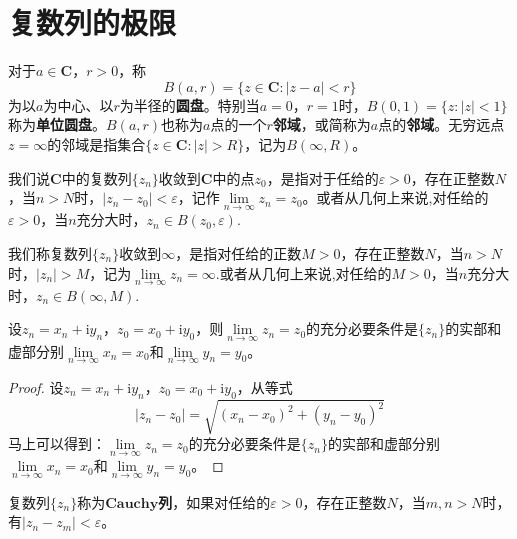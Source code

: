 \documentclass[../../main.tex]{subfiles}
\begin{document}
\section{复数列的极限}

\begin{definition}
对于\(a \in \mathbf{C}\)，\(r > 0\)，称
\[
B(a, r) = \{ z \in \mathbf{C} : | z - a | < r \}
\]
为以\(a\)为中心、以\(r\)为半径的\textbf{圆盘}。特别当\(a = 0\)，\(r = 1\)时，\(B(0, 1) = \{ z : | z | < 1 \}\)称为\textbf{单位圆盘}。\(B(a, r)\)也称为\(a\)点的一个\textbf{\(r\)邻域}，或简称为\(a\)点的\textbf{邻域}。无穷远点\(z = \infty\)的邻域是指集合\(\{ z \in \mathbf{C} : | z | > R \}\)，记为\(B(\infty, R)\)。
\end{definition}

\begin{definition}
我们说\(\mathbf{C}\)中的复数列\(\{ z_n \}\)收敛到\(\mathbf{C}\)中的点\(z_0\)，是指对于任给的\(\varepsilon > 0\)，存在正整数\(N\)，当\(n > N\)时，\(| z_n - z_0 | < \varepsilon\)，记作\(\lim\limits_{n \to \infty} z_n = z_0\)。或者从几何上来说,对任给的\(\varepsilon > 0\)，当\(n\)充分大时，\(z_n \in B(z_0, \varepsilon)\).

我们称复数列\(\{ z_n \}\)收敛到\(\infty\)，是指对任给的正数\(M > 0\)，存在正整数\(N\)，当\(n > N\)时，\(| z_n | > M\)，记为\(\lim\limits_{n \to \infty} z_n = \infty\).或者从几何上来说,对任给的\(M > 0\)，当\(n\)充分大时，\(z_n \in B(\infty, M)\).
\end{definition}

\begin{theorem}\label{theorem:复数收敛的充要条件}
设\(z_n = x_n + \mathrm{i}y_n\)，\(z_0 = x_0 + \mathrm{i}y_0\)，则\(\lim\limits_{n \to \infty} z_n = z_0\)的充分必要条件是\(\{ z_n \}\)的实部和虚部分别\(\lim\limits_{n \to \infty} x_n = x_0\)和\(\lim\limits_{n \to \infty} y_n = y_0\)。
\end{theorem}
\begin{proof}
设\(z_n = x_n + \mathrm{i}y_n\)，\(z_0 = x_0 + \mathrm{i}y_0\)，从等式
\[
| z_n - z_0 | = \sqrt{(x_n - x_0)^2 + (y_n - y_0)^2}
\]
马上可以得到：\(\lim\limits_{n \to \infty} z_n = z_0\)的充分必要条件是\(\{ z_n \}\)的实部和虚部分别\(\lim\limits_{n \to \infty} x_n = x_0\)和\(\lim\limits_{n \to \infty} y_n = y_0\)。

\end{proof}

\begin{definition}
复数列\(\{ z_n \}\)称为\(\mathbf{Cauchy}\)\textbf{列}，如果对任给的\(\varepsilon > 0\)，存在正整数\(N\)，当\(m, n > N\)时，有\(| z_n - z_m | < \varepsilon\)。
\end{definition}
\end{document}
